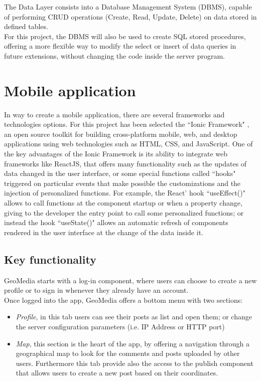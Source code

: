 \documentclass[conference]{IEEEtran}
\begin{document}
The Data Layer consists into a Database Management System (DBMS), capable of performing CRUD operations (Create, Read, Update, Delete) on data stored in defined tables.
\\
For this project, the DBMS will also be used to create SQL stored procedures, offering a more flexible way to modify the select or insert of data queries in future extensions, without changing the code inside the server program.


\section{Mobile application}
In way to create a mobile application, there are several frameworks and technologies options. For this project has been selected the ``Ionic Framework" \cite{b1}, an open source toolkit for building cross-platform mobile, web, and desktop applications using web technologies such as HTML, CSS, and JavaScript.
One of the key advantages of the Ionic Framework is its ability to integrate web frameworks like ReactJS, that offers many functionality such as the updates of data changed in the user interface, or some special functions called ``hooks" triggered on particular events that make possible the customizations and the injection of personalized functions.
For example, the React' hook ``useEffect()" allows to call functions at the component startup or when a property change, giving to the developer the entry point to call some personalized functions; or instead the hook ``useState()" allows an automatic refresh of components rendered in the user interface at the change of the data inside it.


\subsection{Key functionality }

GeoMedia starts with a log-in component, where users can choose to create a new profile or to sign in whenever they already have an account.
\\
Once logged into the app, GeoMedia offers a bottom menu with two sections: 
\begin{itemize}
    \item \textit{Profile}, in this tab users can see their posts as list and open them; or change the server configuration parameters (i.e. IP Address or HTTP port)
    \item  \textit{Map}, this section is the heart of the app, by offering a navigation through a geographical map to look for the comments and posts uploaded by other users. Furthermore this tab provide also the access to the publish component that allows users to create a new post based on their coordinates.
\end{itemize}
\end{document}
